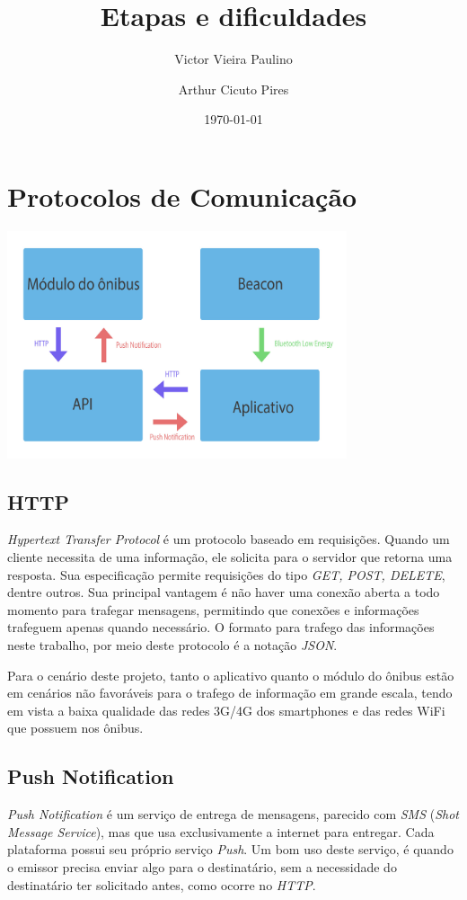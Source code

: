 \documentclass[a4paper, 12pt]{article}
\title{Etapas e dificuldades}
\author{Victor Vieira Paulino
\and
Arthur Cicuto Pires}
\date{\today}
\begin{document}
\maketitle

\section{Protocolos de Comunicação}

\includegraphics[width=10cm, center]{images/diagram_protocols}

\subsection{HTTP}

\textit{Hypertext Transfer Protocol} é um protocolo baseado em requisições. Quando um cliente necessita de uma informação, ele solicita para o servidor que retorna uma resposta. Sua especificação permite requisições do tipo \textit{GET, POST, DELETE}, dentre outros. Sua principal vantagem é não haver uma conexão aberta a todo momento para trafegar mensagens, permitindo que conexões e informações trafeguem apenas quando necessário. O formato para trafego das informações neste trabalho, por meio deste protocolo é a notação \textit{JSON}.

Para o cenário deste projeto, tanto o aplicativo quanto o módulo do ônibus estão em cenários não favoráveis para o trafego de informação em grande escala, tendo em vista a baixa qualidade das redes 3G/4G dos smartphones e das redes WiFi que possuem nos ônibus.

\subsection{Push Notification}

\textit{Push Notification} é um serviço de entrega de mensagens, parecido com \textit{SMS} (\textit{Shot Message Service}), mas que usa exclusivamente a internet para entregar. Cada plataforma possui seu próprio serviço \textit{Push}. Um bom uso deste serviço, é quando o emissor precisa enviar algo para o destinatário, sem a necessidade do destinatário ter solicitado antes, como ocorre no \textit{HTTP}.
\end{document}

